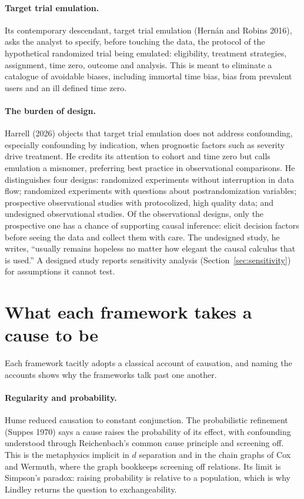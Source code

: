 \paragraph{Target trial emulation.} Its contemporary descendant, target trial emulation (Hern\'an and Robins 2016), asks the analyst to specify, before touching the data, the protocol of the hypothetical randomized trial being emulated: eligibility, treatment strategies, assignment, time zero, outcome and analysis. This is meant to eliminate a catalogue of avoidable biases, including immortal time bias, bias from prevalent users and an ill defined time zero.

\paragraph{The burden of design.} Harrell (2026) objects that target trial emulation does not address confounding, especially confounding by indication, when prognostic factors such as severity drive treatment. He credits its attention to cohort and time zero but calls emulation a misnomer, preferring best practice in observational comparisons. He distinguishes four designs: randomized experiments without interruption in data flow; randomized experiments with questions about postrandomization variables; prospective observational studies with protocolized, high quality data; and undesigned observational studies. Of the observational designs, only the prospective one has a chance of supporting causal inference: elicit decision factors before seeing the data and collect them with care. The undesigned study, he writes, ``usually remains hopeless no matter how elegant the causal calculus that is used.'' A designed study reports sensitivity analysis (Section~\ref{sec:sensitivity}) for assumptions it cannot test.

\section{What each framework takes a cause to be}\label{fw:sec:philosophy}\label{fw:sec:compare}

Each framework tacitly adopts a classical account of causation, and naming the accounts shows why the frameworks talk past one another.

\paragraph{Regularity and probability.} Hume reduced causation to constant conjunction. The probabilistic refinement (Suppes 1970) says a cause raises the probability of its effect, with confounding understood through Reichenbach's common cause principle and screening off. This is the metaphysics implicit in $d$ separation and in the chain graphs of Cox and Wermuth, where the graph bookkeeps screening off relations. Its limit is Simpson's paradox: raising probability is relative to a population, which is why Lindley returns the question to exchangeability.

